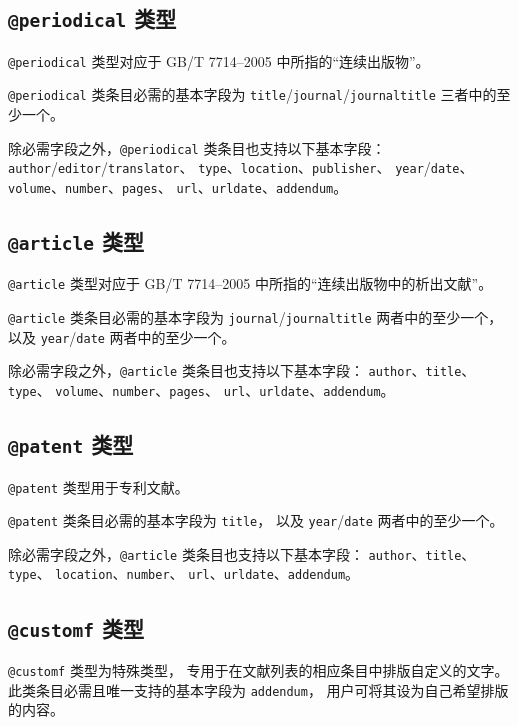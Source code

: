 \documentclass[UTF8, fancyhdr, hyperref]{ctexart}
\begin{document}
\subsection{\texttt{@periodical} 类型}

\verb|@periodical| 类型对应于 GB/T 7714--2005 中所指的“连续出版物”。

\verb|@periodical| 类条目必需的基本字段为
\verb|title|/\verb|journal|/\verb|journaltitle| 三者中的至少一个。

除必需字段之外，\verb|@periodical| 类条目也支持以下基本字段：%
\verb|author|/\verb|editor|/\verb|translator|、%
\verb|type|、\verb|location|、\verb|publisher|、%
\verb|year|/\verb|date|、\verb|volume|、\verb|number|、\verb|pages|、%
\verb|url|、\verb|urldate|、\verb|addendum|。

\subsection{\texttt{@article} 类型}

\verb|@article| 类型对应于 GB/T 7714--2005 中所指的“连续出版物中的析出文献”。

\verb|@article| 类条目必需的基本字段为
\verb|journal|/\verb|journaltitle| 两者中的至少一个，
以及 \verb|year|/\verb|date| 两者中的至少一个。

除必需字段之外，\verb|@article| 类条目也支持以下基本字段：%
\verb|author|、\verb|title|、\verb|type|、%
\verb|volume|、\verb|number|、\verb|pages|、%
\verb|url|、\verb|urldate|、\verb|addendum|。

\subsection{\texttt{@patent} 类型}

\verb|@patent| 类型用于专利文献。

\verb|@patent| 类条目必需的基本字段为 \verb|title|，
以及 \verb|year|/\verb|date| 两者中的至少一个。

除必需字段之外，\verb|@article| 类条目也支持以下基本字段：%
\verb|author|、\verb|title|、\verb|type|、%
\verb|location|、\verb|number|、%
\verb|url|、\verb|urldate|、\verb|addendum|。

\subsection{\texttt{@customf} 类型}

\verb|@customf| 类型为特殊类型，
专用于在文献列表的相应条目中排版自定义的文字。
此类条目必需且唯一支持的基本字段为 \verb|addendum|，
用户可将其设为自己希望排版的内容。
\end{document}
